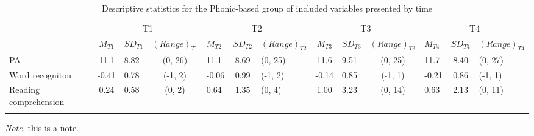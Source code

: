 \documentclass[
  ,
]{article}
\begin{document}
\begin{table}[tbp]

\begin{center}
\begin{threeparttable}

\caption{\label{tab:desc-read-PB-table}Descriptive statistics for the Phonic-based group of included variables presented by time}

\small{

\begin{tabular}{lclclclclclcl}
\toprule
 & \multicolumn{3}{c}{T1} & \multicolumn{3}{c}{T2} & \multicolumn{3}{c}{T3} & \multicolumn{3}{c}{T4} \\
\cmidrule(r){2-4} \cmidrule(r){5-7} \cmidrule(r){8-10} \cmidrule(r){11-13}
  & $M_{T1}$ & $SD_{T1}$ & $(Range)_{T1}$ & $M_{T2}$ & $SD_{T2}$ & $(Range)_{T2}$ & $M_{T3}$ & $SD_{T3}$ & $(Range)_{T3}$ & $M_{T4}$ & $SD_{T4}$ & $(Range)_{T4}$\\
\midrule
PA & 11.1 & 8.82 & (0, 26) & 11.1 & 8.69 & (0, 25) & 11.6 & 9.51 & (0, 25) & 11.7 & 8.40 & (0, 27)\\
Word recogniton & -0.41 & 0.78 & (-1, 2) & -0.06 & 0.99 & (-1, 2) & -0.14 & 0.85 & (-1, 1) & -0.21 & 0.86 & (-1, 1)\\
Reading comprehension & 0.24 & 0.58 & (0, 2) & 0.64 & 1.35 & (0, 4) & 1.00 & 3.23 & (0, 14) & 0.63 & 2.13 & (0, 11)\\
\bottomrule
\addlinespace
\end{tabular}

}

\begin{tablenotes}[para]
\normalsize{\textit{Note.} this is a note.}
\end{tablenotes}

\end{threeparttable}
\end{center}

\end{table}
\end{document}
